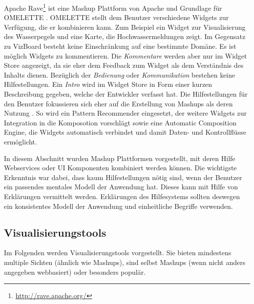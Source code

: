 \documentclass[
	headsepline,
	footsepline,
	fontsize=12pt,
	bibliography=totoc
]{scrbook}
\begin{document}

Apache Rave\footnote{\url{http://rave.apache.org/}} ist eine Mashup Plattform von Apache und Grundlage für OMELETTE \cite{Chudnovskyy2012}. OMELETTE stellt dem Benutzer verschiedene Widgets zur Verfügung, die er kombinieren kann. Zum Beispiel ein Widget zur Visualisierung des Wasserpegels und eine Karte, die Hochwassermeldungen zeigt. Im Gegensatz zu VizBoard besteht keine Einschränkung auf eine bestimmte Domäne. Es ist möglich Widgets zu kommentieren. Die \emph{Kommentare} werden aber nur im Widget Store angezeigt, da sie eher dem Feedback zum Widget als dem Verständnis des Inhalts dienen. Bezüglich der \emph{Bedienung} oder \emph{Kommunikation} bestehen keine Hilfestellungen. Ein \emph{Intro} wird im Widget Store in Form einer kurzen Beschreibung gegeben, welche der Entwickler verfasst hat. Die Hilfestellungen für den Benutzer fokussieren sich eher auf die Erstellung von Mashups als deren Nutzung \cite{Chowdhury2013}. So wird ein Pattern Recommender eingesetzt, der weitere Widgets zur Integration in die Komposotion vorschlägt sowie eine Automatic Composition Engine, die Widgets automatisch verbindet und damit Daten- und Kontrollflüsse ermöglicht.



In diesem Abschnitt wurden Mashup Plattformen vorgestellt, mit deren Hilfe Webservices oder UI Komponenten kombiniert werden können. Die wichtigste Erkenntnis war dabei, dass kaum Hilfestellungen nötig sind, wenn der Benutzer ein passendes mentales Modell der Anwendung hat. Dieses kann mit Hilfe von Erklärungen vermittelt werden. Erklärungen des Hilfesystems sollten deswegen ein konsistentes Modell der Anwendung und einheitliche Begriffe verwenden.

\subsection{Visualisierungstools}
\label{section:standderforschung:verwandte_arbeiten:visualisierungstools}

Im Folgenden werden Visualisierungstools vorgestellt. Sie bieten mindestens multiple Sichten (ähnlich wie Mashups), sind selbst Mashups (wenn nicht anders angegeben webbasiert) oder besonders populär.
\end{document}
